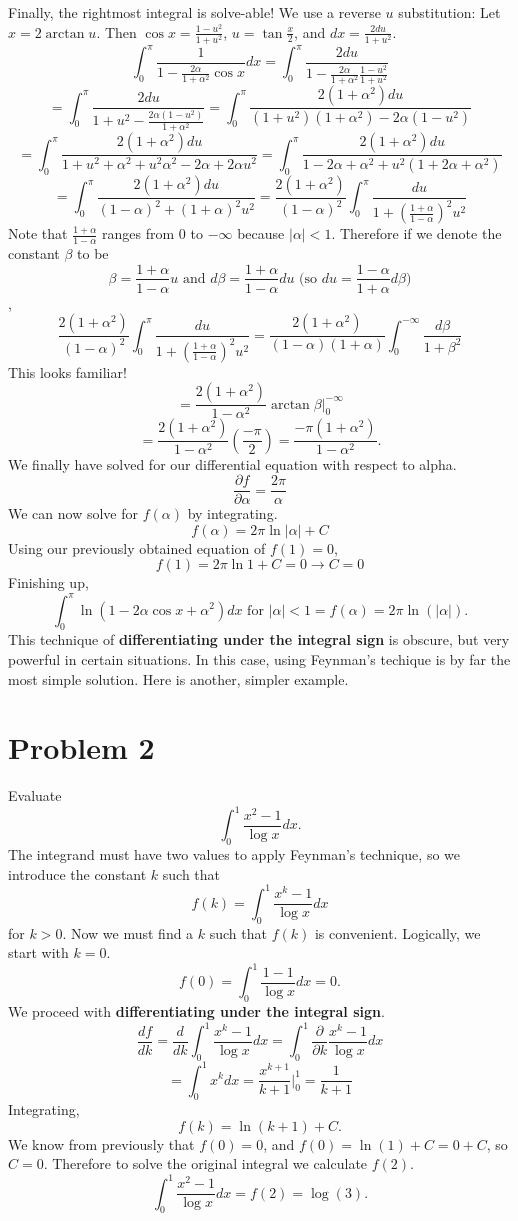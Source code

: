 \documentclass{article}
\begin{document}
Finally, the rightmost integral is solve-able! We use a reverse $u$ substitution: Let $x=2\arctan{u}$. Then $\cos{x}=\frac{1-u^2}{1+u^2}$, $u=\tan{\frac{x}{2}}$, and $dx=\frac{2du}{1+u^2}$.
$$\int_{0}^{\pi}\frac{1}{1-\frac{2\alpha}{1+\alpha^2}\cos{x}}dx = \int_{0}^{\pi}\frac{2du}{1-\frac{2\alpha}{1+\alpha^2}\frac{1-u^2}{1+u^2}}$$
$$= \int_{0}^{\pi}\frac{2du}{1+u^2-\frac{2\alpha(1-u^2)}{1+\alpha^2}} = \int_{0}^{\pi}\frac{2(1+\alpha^2)du}{(1+u^2)(1+\alpha^2)-2\alpha(1-u^2)}$$
$$= \int_{0}^{\pi}\frac{2(1+\alpha^2)du}{1+u^2+\alpha^2+u^2\alpha^2-2\alpha+2\alpha u^2} = \int_{0}^{\pi}\frac{2(1+\alpha^2)du}{1-2\alpha+\alpha^2+u^2(1+2\alpha+\alpha^2)}$$
$$= \int_{0}^{\pi}\frac{2(1+\alpha^2)du}{(1-\alpha)^2+(1+\alpha)^2u^2} = \frac{2(1+\alpha^2)}{(1-\alpha)^2}\int_{0}^{\pi}\frac{du}{1+(\frac{1+\alpha}{1-\alpha})^2u^2}$$
Note that $\frac{1+\alpha}{1-\alpha}$ ranges from 0 to $-\infty$ because $|\alpha|<1$. Therefore if we denote the constant $\beta$ to be $$\beta=\frac{1+\alpha}{1-\alpha}u \text{ and } d\beta=\frac{1+\alpha}{1-\alpha}du \text { (so } du=\frac{1-\alpha}{1+\alpha}d\beta \text{)}$$,
$$\frac{2(1+\alpha^2)}{(1-\alpha)^2}\int_{0}^{\pi}\frac{du}{1+(\frac{1+\alpha}{1-\alpha})^2u^2} = \frac{2(1+\alpha^2)}{(1-\alpha)(1+\alpha)}\int_{0}^{-\infty}\frac{d\beta}{1+\beta^2}$$
This looks familiar!
$$= \frac{2(1+\alpha^2)}{1-\alpha^2}\arctan{\beta}\bigg\vert_{0}^{-\infty}$$
$$= \frac{2(1+\alpha^2)}{1-\alpha^2}(\frac{-\pi}{2}) = \frac{-\pi(1+\alpha^2)}{1-\alpha^2}.$$
We finally have solved for our differential equation with respect to alpha.
$$\frac{\partial f}{\partial \alpha} = \frac{2\pi}{\alpha}$$
We can now solve for $f(\alpha)$ by integrating.
$$f(\alpha) = 2\pi\ln{|\alpha|}+C$$
Using our previously obtained equation of $f(1)=0$,
$$f(1)=2\pi\ln{1}+C=0 \rightarrow C=0$$
Finishing up,
$$\int_{0}^{\pi} \ln(1-2\alpha\cos{x}+\alpha^2)dx \text{ for } |\alpha|<1 = f(\alpha) = \boxed{2\pi\ln(|\alpha|)}.$$ 
This technique of \textbf{differentiating under the integral sign} is obscure, but very powerful in certain situations. In this case, using Feynman's techique is by far the most simple solution. Here is another, simpler example.

\section*{Problem 2}
Evaluate $$\int_{0}^{1}\frac{x^2-1}{\log{x}}dx.$$
The integrand must have two values to apply Feynman's technique, so we introduce the constant $k$ such that
$$f(k) = \int_{0}^{1}\frac{x^k-1}{\log{x}}dx$$ for $k>0$. Now we must find a $k$ such that $f(k)$ is convenient. Logically, we start with $k=0$. 
$$f(0)=\int_{0}^{1}\frac{1-1}{\log{x}}dx = 0.$$
\newline We proceed with \textbf{differentiating under the integral sign}.
$$\frac{df}{dk} = \frac{d}{dk}\int_{0}^{1}\frac{x^k-1}{\log{x}}dx = \int_{0}^{1}\frac{\partial}{\partial k}\frac{x^k-1}{\log{x}}dx$$
$$= \int_{0}^{1}x^kdx = \frac{x^{k+1}}{k+1}\bigg\vert_{0}^{1} = \frac{1}{k+1}$$
Integrating,
$$f(k)=\ln({k+1})+C.$$
We know from previously that $f(0)=0$, and $f(0)=\ln(1)+C=0+C$, so $C=0$. Therefore to solve the original integral we calculate $f(2)$.
$$\int_{0}^{1}\frac{x^2-1}{\log{x}}dx = f(2) = \boxed{\log({3})}.$$
\end{document}
